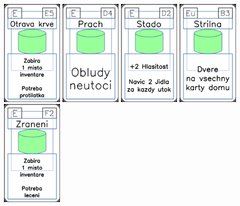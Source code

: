 \documentclass[a4paper]{article}
\begin{document}
	\includegraphics[width=3.0cm]{img-4_54}
	\includegraphics[width=3.0cm]{img-4_48}
	\includegraphics[width=3.0cm]{img-4_46}
	\includegraphics[width=3.0cm]{img-4_37}
	\includegraphics[width=3.0cm]{img-4_56}
\end{document}
